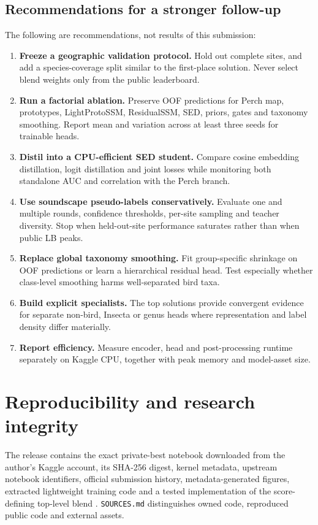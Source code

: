 \documentclass[10pt,a4paper]{article}
\begin{document}
\subsection{Recommendations for a stronger follow-up}
The following are recommendations, not results of this submission:
\begin{enumerate}
  \item \textbf{Freeze a geographic validation protocol.} Hold out complete sites, and add a species-coverage split similar to the first-place solution. Never select blend weights only from the public leaderboard.
  \item \textbf{Run a factorial ablation.} Preserve OOF predictions for Perch map, prototypes, LightProtoSSM, ResidualSSM, SED, priors, gates and taxonomy smoothing. Report mean and variation across at least three seeds for trainable heads.
  \item \textbf{Distil into a CPU-efficient SED student.} Compare cosine embedding distillation, logit distillation and joint losses while monitoring both standalone AUC and correlation with the Perch branch.
  \item \textbf{Use soundscape pseudo-labels conservatively.} Evaluate one and multiple rounds, confidence thresholds, per-site sampling and teacher diversity. Stop when held-out-site performance saturates rather than when public LB peaks.
  \item \textbf{Replace global taxonomy smoothing.} Fit group-specific shrinkage on OOF predictions or learn a hierarchical residual head. Test especially whether class-level smoothing harms well-separated bird taxa.
  \item \textbf{Build explicit specialists.} The top solutions provide convergent evidence for separate non-bird, Insecta or genus heads where representation and label density differ materially.
  \item \textbf{Report efficiency.} Measure encoder, head and post-processing runtime separately on Kaggle CPU, together with peak memory and model-asset size.
\end{enumerate}

\section{Reproducibility and research integrity}
The release contains the exact private-best notebook downloaded from the author's Kaggle account, its SHA-256 digest, kernel metadata, upstream notebook identifiers, official submission history, metadata-generated figures, extracted lightweight training code and a tested implementation of the score-defining top-level blend \cite{graci2026repo}. \texttt{SOURCES.md} distinguishes owned code, reproduced public code and external assets.
\end{document}
